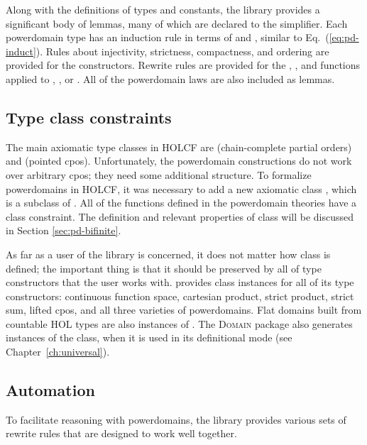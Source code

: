 Along with the definitions of types and constants, the library provides a significant body of lemmas, many of which are declared to the simplifier. Each powerdomain type has an induction rule in terms of  and , similar to Eq.~(\ref{eq:pd-induct}). Rules about injectivity, strictness, compactness, and ordering are provided for the constructors. Rewrite rules are provided for the , , and  functions applied to , , or . All of the powerdomain laws are also included as lemmas.


\subsection{Type class constraints}
\label{sec:pd-class-constraint}

The main axiomatic type classes in HOLCF are  (chain-complete partial orders) and  (pointed cpos). Unfortunately, the powerdomain constructions do not work over arbitrary cpos; they need some additional structure. To formalize powerdomains in HOLCF, it was necessary to add a new axiomatic class , which is a subclass of . All of the functions defined in the  powerdomain theories have a  class constraint. The definition and relevant properties of class  will be discussed in Section \ref{sec:pd-bifinite}.

As far as a user of the library is concerned, it does not matter how class  is defined; the important thing is that it should be preserved by all of type constructors that the user works with.  provides  class instances for all of its type constructors: continuous function space, cartesian product, strict product, strict sum, lifted cpos, and all three varieties of powerdomains. Flat domains built from countable HOL types are also instances of . The \textsc{Domain} package also generates instances of the  class, when it is used in its definitional mode (see Chapter~\ref{ch:universal}).


\subsection{Automation}

To facilitate reasoning with powerdomains, the library provides various sets of rewrite rules that are designed to work well together.


